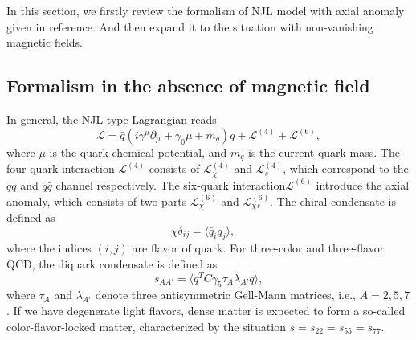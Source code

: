 \documentclass[prd, showpacs,nofootinbib,amsmath,amssymb,12pt]{revtex4}
\begin{document}
In this section, we firstly review the formalism of NJL model with axial anomaly given in reference\cite{abuki2010nambu}.
And then expand it to the situation with  non-vanishing magnetic fields.

\subsection{Formalism in the absence of magnetic  field}
\label{sec:2a}
In general, the NJL-type Lagrangian reads
\begin{equation}
	\mathcal{L} = \bar{q} (i\gamma^\mu \partial_\mu + \gamma_0\mu +m_q) q +
	\mathcal{L}^{(4)}+ \mathcal{L}^{(6)},
	\label{eq:lag}
\end{equation}
where $\mu$ is the quark chemical potential, and $m_q$ is the current quark mass.
The four-quark interaction $\mathcal{L}^{(4)}$ consists of $\mathcal{L}^{(4)}_\chi$ and $\mathcal{L}^{(4)}_s$, 
which correspond to the $qq$ and $q\bar{q}$ channel respectively.
The six-quark interaction$\mathcal{L}^{(6)}$ introduce the axial anomaly,
which consists of two parts $\mathcal{L}^{(6)}_{\chi}$ and $\mathcal{L}^{(6)}_{\chi s}$. 
The chiral condensate is defined as 
\begin{equation}
\chi\delta_{ij}= \langle\bar{q}_i q_j\rangle,\quad
\end{equation}
where the indices $(i,j)$ are flavor of quark. 
For three-color and three-flavor QCD, the diquark condensate is defined as \cite{Buballa2002Color}
\begin{equation}
s_{AA'}=\langle q^TC\gamma_5\tau_A\lambda_{A'} q\rangle,
\end{equation}
where $\tau_A$ and $\lambda_{A'}$ denote three antisymmetric Gell-Mann matrices, i.e., $A=2,5,7$.
If we have degenerate light flavors, dense matter is expected to form a so-called color-flavor-locked matter, characterized by the situation $s=s_{22}=s_{55}=s_{77}$.
\end{document}
